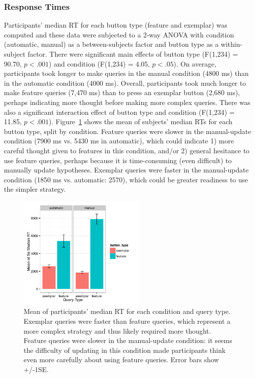 \documentclass[man,floatsintext]{apa6}
\begin{document}
  
 
\subsubsection{Response Times}

Participants' median RT for each button type (feature and exemplar) was computed and these data were subjected to a 2-way ANOVA with condition (automatic, manual) as a 
between-subjects factor and button type as a within-subject factor. There
were significant main effects of button type (F(1,234) = 90.70, $p<.
001$) and condition (F(1,234) = 4.05, $p<.05$). On average, participants took longer to make queries in the manual condition (4800 ms) than in the automatic condition (4000 ms). Overall, participants took much longer to 
make feature queries (7,470 ms) than to press an exemplar button (2,680 ms), 
perhaps indicating more thought before making more complex queries. There was also a significant 
interaction effect of button type and condition (F(1,234) = 11.85, $p<.001$). Figure~\ref{fig:basic-rt} shows the mean of subjects' median RTs for each button type, split by condition. Feature queries were 
slower in the manual-update condition (7900 ms vs. 5430 ms in automatic), which could indicate 1) more careful thought given to features in this condition, and/or 2) general hesitance to use feature 
queries, perhaps because it is time-consuming (even difficult) to manually update 
hypotheses. Exemplar queries were faster in the manual-update condition (1850 ms vs. automatic: 2570),
which could be greater readiness to use the simpler strategy.

\begin{figure}[h]
  \centering
  \includegraphics[width=0.55\textwidth]{figures/RT_by_condition_query_type}
  \caption{Mean of participants' median RT for each condition and query type. 
Exemplar queries were faster than feature queries, which represent a more complex 
strategy and thus likely required more thought. Feature queries were slower in the 
manual-update condition: it seems the difficulty of updating in this condition made 
participants think even more carefully about using feature queries. Error bars show 
+/-1SE.}
  \label{fig:basic-rt}
\end{figure} 
\end{document}
